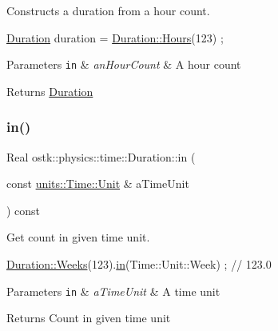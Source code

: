 Constructs a duration from a hour count. 


\begin{DoxyCode}
\hyperlink{classostk_1_1physics_1_1time_1_1_duration_a6ba3a020742ca6e3bf0b1970dd039c07}{Duration} duration = \hyperlink{classostk_1_1physics_1_1time_1_1_duration_a950723133d46c93a06907543d15e4dc0}{Duration::Hours}(123) ;
\end{DoxyCode}



\begin{DoxyParams}[1]{Parameters}
\mbox{\tt in}  & {\em an\+Hour\+Count} & A hour count \\
\hline
\end{DoxyParams}
\begin{DoxyReturn}{Returns}
\hyperlink{classostk_1_1physics_1_1time_1_1_duration}{Duration} 
\end{DoxyReturn}
\mbox{\label{classostk_1_1physics_1_1time_1_1_duration_a03f34bc3528d1e33efdc9da44df157f4}} 
\subsubsection{\texorpdfstring{in()}{in()}}
{\footnotesize\ttfamily Real ostk\+::physics\+::time\+::\+Duration\+::in (\begin{DoxyParamCaption}\item[{const \hyperlink{classostk_1_1physics_1_1units_1_1_time_aa961f0dbca7ec297e19e15e0dfa3bb4a}{units\+::\+Time\+::\+Unit} \&}]{a\+Time\+Unit }\end{DoxyParamCaption}) const}



Get count in given time unit. 


\begin{DoxyCode}
\hyperlink{classostk_1_1physics_1_1time_1_1_duration_a6186e3350364f407e390f520b93dbf83}{Duration::Weeks}(123).\hyperlink{classostk_1_1physics_1_1time_1_1_duration_a03f34bc3528d1e33efdc9da44df157f4}{in}(Time::Unit::Week) ; \textcolor{comment}{// 123.0}
\end{DoxyCode}



\begin{DoxyParams}[1]{Parameters}
\mbox{\tt in}  & {\em a\+Time\+Unit} & A time unit \\
\hline
\end{DoxyParams}
\begin{DoxyReturn}{Returns}
Count in given time unit 
\end{DoxyReturn}
\mbox{\label{classostk_1_1physics_1_1time_1_1_duration_a2c8f2e97717d02ba4f8dc044fe4f0b1e}} 
